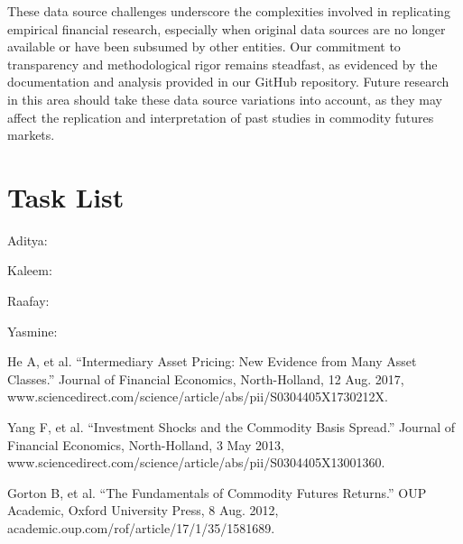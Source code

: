 \documentclass{article}
\begin{document}
These data source challenges underscore the complexities involved in replicating empirical financial research, especially when original data sources are no longer available or have been subsumed by other entities. Our commitment to transparency and methodological rigor remains steadfast, as evidenced by the documentation and analysis provided in our GitHub repository. Future research in this area should take these data source variations into account, as they may affect the replication and interpretation of past studies in commodity futures markets.





\section{Task List}

\item{Aditya:}
\item{Kaleem:}
\item{Raafay:}
\item{Yasmine:}












\begin{thebibliography}{99}


He A, et al. “Intermediary Asset Pricing: New Evidence from Many Asset Classes.” Journal of Financial Economics, North-Holland, 12 Aug. 2017, www.sciencedirect.com/science/article/abs/pii/S0304405X1730212X. 

Yang F, et al. “Investment Shocks and the Commodity Basis Spread.” Journal of Financial Economics, North-Holland, 3 May 2013, www.sciencedirect.com/science/article/abs/pii/S0304405X13001360. 

Gorton B, et al. “The Fundamentals of Commodity Futures Returns.” OUP Academic, Oxford University Press, 8 Aug. 2012, academic.oup.com/rof/article/17/1/35/1581689. 



\end{thebibliography}
\end{document}
